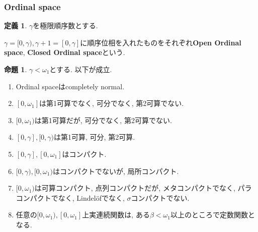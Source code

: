 \documentclass[a4paper, twoside]{bxjsarticle}
\theoremstyle{definition}
\newtheorem{prop}[thm]{命題}
\newtheorem{defn}[thm]{定義}
\begin{document}
    \subsubsection{Ordinal space}
        \begin{defn}
            $\gamma$を極限順序数とする. 
            
            $\gamma=[0, \gamma), \gamma+1=[0, \gamma]$に順序位相を入れたものをそれぞれ\textbf{Open Ordinal space}, \textbf{Closed Ordinal space}という. 
        \end{defn}
        \begin{prop}
            $\gamma<\omega_1$とする. 以下が成立.
            \begin{enumerate}
                \item Ordinal spaceはcompletely normal.
                \item $[0, \omega_1]$は第1可算でなく, 可分でなく, 第2可算でない.
                \item $[0, \omega_1)$は第1可算だが, 可分でなく, 第2可算でない.
                \item $[0, \gamma], [0, \gamma)$は第1可算, 可分, 第2可算.
                \item $[0, \gamma], [0, \omega_1]$はコンパクト.
                \item $[0, \gamma), [0, \omega_1)$はコンパクトでないが, 局所コンパクト.
                \item $[0, \omega_1)$は可算コンパクト, 点列コンパクトだが, メタコンパクトでなく, パラコンパクトでなく, Lindelöfでなく, $\sigma$コンパクトでない.
                \item 任意の$[0, \omega_1), [0, \omega_1]$上実連続関数は, ある$\beta<\omega_1$以上のところで定数関数となる.
            \end{enumerate}
        \end{prop}
\end{document}
